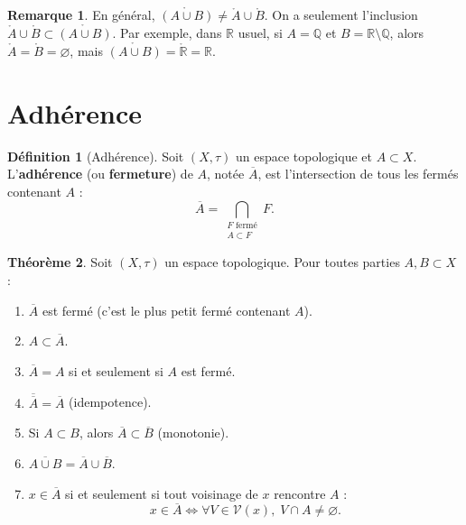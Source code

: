 \documentclass[12pt,a4paper,openany]{book}
\theoremstyle{definition}
\newtheorem{definition}{Définition}[chapter]
\theoremstyle{cours}
\newtheorem{theoreme}{Théorème}[chapter]
\theoremstyle{coursnormal}
\newtheorem{remarque}[theoreme]{Remarque}
\newcommand{\Q}{\mathbb{Q}}
\newcommand{\R}{\mathbb{R}}
\newcommand{\Int}[1]{\mathring{#1}}
\newcommand{\Cl}[1]{\overline{#1}}
\newcommand{\Vois}[1]{\mathcal{V}(#1)}
\begin{document}
\begin{remarque}\label{rem:int-reunion}
  En général, $\Int{(A \cup B)} \neq \Int{A} \cup \Int{B}$. On a seulement l'inclusion $\Int{A} \cup \Int{B} \subset \Int{(A \cup B)}$. Par exemple, dans $\R$ usuel, si $A = \Q$ et $B = \R \setminus \Q$, alors $\Int{A} = \Int{B} = \varnothing$, mais $\Int{(A \cup B)} = \Int{\R} = \R$.
\end{remarque}

\section{Adhérence}
\label{sec:adherence}

\begin{definition}[Adhérence]\label{def:adherence}
  Soit $(X,\tau)$ un espace topologique et $A \subset X$. L'\textbf{adhérence} (ou \textbf{fermeture}) de $A$, notée $\Cl{A}$, est l'intersection de tous les fermés contenant $A$ :
  \[
    \Cl{A} = \bigcap_{\substack{F \text{ fermé} \\ A \subset F}} F.
  \]
\end{definition}

\begin{theoreme}\label{thm:proprietes-adherence}
  Soit $(X,\tau)$ un espace topologique. Pour toutes parties $A, B \subset X$ :
  \begin{enumerate}[label=(\roman*)]
    \item\label{it:cl-ferme} $\Cl{A}$ est fermé (c'est le plus petit fermé contenant $A$).
    \item\label{it:cl-contient} $A \subset \Cl{A}$.
    \item\label{it:cl-carac} $\Cl{A} = A$ si et seulement si $A$ est fermé.
    \item\label{it:cl-idempotent} $\Cl{\Cl{A}} = \Cl{A}$ (idempotence).
    \item\label{it:cl-monotone} Si $A \subset B$, alors $\Cl{A} \subset \Cl{B}$ (monotonie).
    \item\label{it:cl-reunion} $\Cl{A \cup B} = \Cl{A} \cup \Cl{B}$.
    \item\label{it:cl-voisinage} $x \in \Cl{A}$ si et seulement si tout voisinage de $x$ rencontre $A$ :
    \[
      x \in \Cl{A} \iff \forall V \in \Vois{x},\; V \cap A \neq \varnothing.
    \]
  \end{enumerate}
\end{theoreme}
\end{document}
